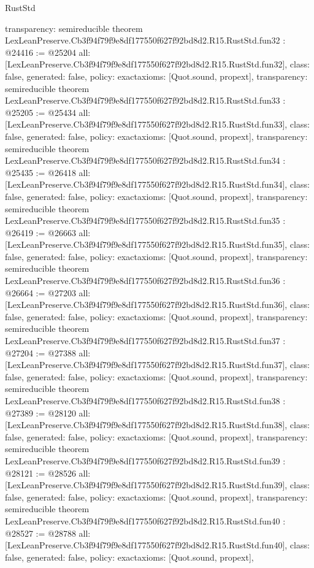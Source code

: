 \begin{lexlean}{RustStd}
\begin{coremodule}
{  transparency: semireducible
}
theorem LexLeanPreserve.Cb3f94f79f9e8df177550f627f92bd8d2.R15.RustStd.fun32 : @24416 := @25204 {
  all: [LexLeanPreserve.Cb3f94f79f9e8df177550f627f92bd8d2.R15.RustStd.fun32],
  class: false,
  generated: false,
  policy: exact{axioms: [Quot.sound, propext]},
  transparency: semireducible
}
theorem LexLeanPreserve.Cb3f94f79f9e8df177550f627f92bd8d2.R15.RustStd.fun33 : @25205 := @25434 {
  all: [LexLeanPreserve.Cb3f94f79f9e8df177550f627f92bd8d2.R15.RustStd.fun33],
  class: false,
  generated: false,
  policy: exact{axioms: [Quot.sound, propext]},
  transparency: semireducible
}
theorem LexLeanPreserve.Cb3f94f79f9e8df177550f627f92bd8d2.R15.RustStd.fun34 : @25435 := @26418 {
  all: [LexLeanPreserve.Cb3f94f79f9e8df177550f627f92bd8d2.R15.RustStd.fun34],
  class: false,
  generated: false,
  policy: exact{axioms: [Quot.sound, propext]},
  transparency: semireducible
}
theorem LexLeanPreserve.Cb3f94f79f9e8df177550f627f92bd8d2.R15.RustStd.fun35 : @26419 := @26663 {
  all: [LexLeanPreserve.Cb3f94f79f9e8df177550f627f92bd8d2.R15.RustStd.fun35],
  class: false,
  generated: false,
  policy: exact{axioms: [Quot.sound, propext]},
  transparency: semireducible
}
theorem LexLeanPreserve.Cb3f94f79f9e8df177550f627f92bd8d2.R15.RustStd.fun36 : @26664 := @27203 {
  all: [LexLeanPreserve.Cb3f94f79f9e8df177550f627f92bd8d2.R15.RustStd.fun36],
  class: false,
  generated: false,
  policy: exact{axioms: [Quot.sound, propext]},
  transparency: semireducible
}
theorem LexLeanPreserve.Cb3f94f79f9e8df177550f627f92bd8d2.R15.RustStd.fun37 : @27204 := @27388 {
  all: [LexLeanPreserve.Cb3f94f79f9e8df177550f627f92bd8d2.R15.RustStd.fun37],
  class: false,
  generated: false,
  policy: exact{axioms: [Quot.sound, propext]},
  transparency: semireducible
}
theorem LexLeanPreserve.Cb3f94f79f9e8df177550f627f92bd8d2.R15.RustStd.fun38 : @27389 := @28120 {
  all: [LexLeanPreserve.Cb3f94f79f9e8df177550f627f92bd8d2.R15.RustStd.fun38],
  class: false,
  generated: false,
  policy: exact{axioms: [Quot.sound, propext]},
  transparency: semireducible
}
theorem LexLeanPreserve.Cb3f94f79f9e8df177550f627f92bd8d2.R15.RustStd.fun39 : @28121 := @28526 {
  all: [LexLeanPreserve.Cb3f94f79f9e8df177550f627f92bd8d2.R15.RustStd.fun39],
  class: false,
  generated: false,
  policy: exact{axioms: [Quot.sound, propext]},
  transparency: semireducible
}
theorem LexLeanPreserve.Cb3f94f79f9e8df177550f627f92bd8d2.R15.RustStd.fun40 : @28527 := @28788 {
  all: [LexLeanPreserve.Cb3f94f79f9e8df177550f627f92bd8d2.R15.RustStd.fun40],
  class: false,
  generated: false,
  policy: exact{axioms: [Quot.sound, propext]},
}
\end{coremodule}
\end{lexlean}
